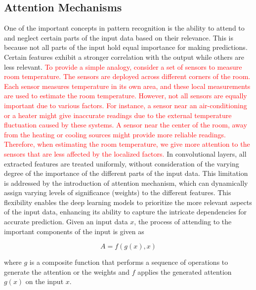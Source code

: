 \documentclass[preprint,12pt]{elsarticle}
\begin{document}
\subsection{Attention Mechanisms}
One of the important concepts in pattern recognition is the ability to attend to and neglect certain parts of the input data based on their relevance. This is because not all parts of the input hold equal importance for making predictions. Certain features exhibit a stronger correlation with the output while others are less relevant. \textcolor{red}{To provide a simple analogy, consider a set of sensors to measure room temperature. The sensors are deployed across different corners of the room. Each sensor measures temperature in its own area, and these local measurements are used to estimate the room temperature. However, not all sensors are equally important due to various factors. For instance, a sensor near an air-conditioning or a heater might give inaccurate readings due to the external temperature fluctuation caused by these systems. A sensor near the center of the room, away from the heating or cooling sources might provide more reliable readings. Therefore, when estimating the room temperature, we give more attention to the sensors that are less affected by the localized factors.} In convolutional layers, all extracted features are treated uniformly, without consideration of the varying degree of the importance of the different parts of the input data. This limitation is addressed by the introduction of attention mechanism, which can dynamically assign varying levels of significance (weights) to the different features. This flexibility enables the deep learning models to prioritize the more relevant aspects of the input data, enhancing its ability to capture the intricate dependencies for accurate prediction. Given an input data $x$, the process of attending to the important components of the input is given as

\begin{equation}
A=f(g(x),x)
\end{equation}

\noindent where $g$ is a composite function that performs a sequence of operations to generate the attention or the weights and $f$ applies the generated attention $g(x)$ on the input $x$. 
\end{document}
